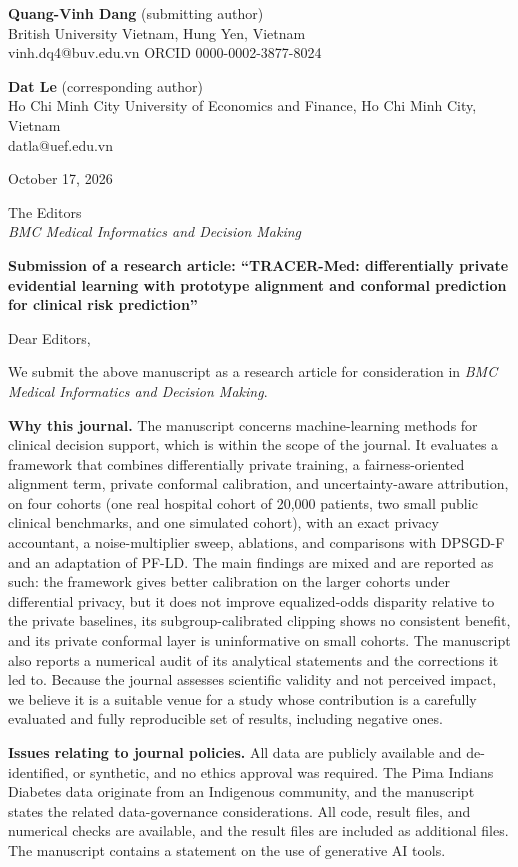 \documentclass[11pt,a4paper]{article}
\begin{document}
\textbf{Quang-Vinh Dang} (submitting author) \\
British University Vietnam, Hung Yen, Vietnam \\
vinh.dq4@buv.edu.vn \quad ORCID 0000-0002-3877-8024

\textbf{Dat Le} (corresponding author) \\
Ho Chi Minh City University of Economics and Finance, Ho Chi Minh City, Vietnam \\
datla@uef.edu.vn

October 17, 2026

The Editors \\
\emph{BMC Medical Informatics and Decision Making}

\textbf{Submission of a research article: ``TRACER-Med: differentially private evidential learning with prototype alignment and conformal prediction for clinical risk prediction''}

Dear Editors,

We submit the above manuscript as a research article for consideration in \emph{BMC Medical Informatics and Decision Making}.

\textbf{Why this journal.} The manuscript concerns machine-learning methods for clinical decision support, which is within the scope of the journal. It evaluates a framework that combines differentially private training, a fairness-oriented alignment term, private conformal calibration, and uncertainty-aware attribution, on four cohorts (one real hospital cohort of 20,000 patients, two small public clinical benchmarks, and one simulated cohort), with an exact privacy accountant, a noise-multiplier sweep, ablations, and comparisons with DPSGD-F and an adaptation of PF-LD. The main findings are mixed and are reported as such: the framework gives better calibration on the larger cohorts under differential privacy, but it does not improve equalized-odds disparity relative to the private baselines, its subgroup-calibrated clipping shows no consistent benefit, and its private conformal layer is uninformative on small cohorts. The manuscript also reports a numerical audit of its analytical statements and the corrections it led to. Because the journal assesses scientific validity and not perceived impact, we believe it is a suitable venue for a study whose contribution is a carefully evaluated and fully reproducible set of results, including negative ones.

\textbf{Issues relating to journal policies.} All data are publicly available and de-identified, or synthetic, and no ethics approval was required. The Pima Indians Diabetes data originate from an Indigenous community, and the manuscript states the related data-governance considerations. All code, result files, and numerical checks are available, and the result files are included as additional files. The manuscript contains a statement on the use of generative AI tools.
\end{document}
